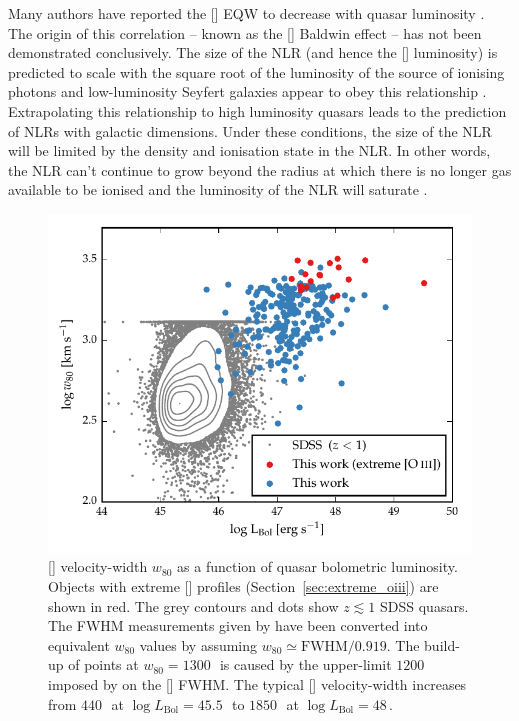 Many authors have reported the [] EQW to decrease with quasar luminosity \citep[e.g.][]{brotherton96,sulentic04,baskin05b,zhang11,stern12}.
The origin of this correlation -- known as the [] Baldwin effect \citep[e.g.][]{baldwin77} -- has not been demonstrated conclusively. 
The size of the NLR (and hence the [] luminosity) is predicted to scale with the square root of the luminosity of the source of ionising photons \citep[e.g.][]{netzer90} and low-luminosity Seyfert galaxies appear to obey this relationship \citep[e.g.][]{bennert02}. 
Extrapolating this relationship to high luminosity quasars leads to the prediction of NLRs with galactic dimensions.
Under these conditions, the size of the NLR will be limited by the density and ionisation state in the NLR. 
In other words, the NLR can't continue to grow beyond the radius at which there is no longer gas available to be ionised and the luminosity of the NLR will saturate \citep[e.g.][]{hainline13,hainline14}. 

\begin{figure}[t!]
    \centering
    \includegraphics[width=\columnwidth]{figures/chapter04/lum_w80.pdf} 
    \caption[{[] velocity-width $w_{80}$ as a function of quasar bolometric luminosity.}]{[] velocity-width $w_{80}$ as a function of quasar bolometric luminosity. Objects with extreme [] profiles (Section~\ref{sec:extreme_oiii}) are shown in red. The grey contours and dots show $z\lesssim1$ SDSS quasars. The FWHM measurements given by \citet{shen11} have been converted into equivalent $w_{80}$ values by assuming $w_{80} \simeq \text{FWHM} / 0.919$. The build-up of points at $w_{80}=1300$\,\kms\, is caused by the upper-limit $1200$\,\kms\, imposed by \citet{shen11} on the [] FWHM. The typical [] velocity-width increases from $440$\,\kms\, at $\log L_{\text{Bol}}=45.5$\,\ergs\, to $1850$\,\kms\, at $\log L_{\text{Bol}}=48$\,\ergs.} 
    \label{fig:lum_w80}
\end{figure}

